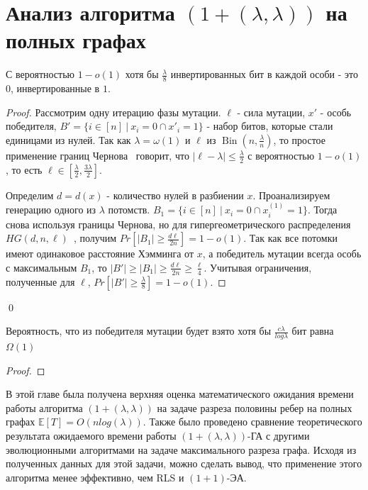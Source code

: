 \documentclass[times]{itmo-student-thesis}
\newcommand{\alglambda}{${(1 + (\lambda , \lambda))}$\xspace}
\newcommand{\alglambdaf}{${(1 + (\lambda , \lambda))}$-ГА\xspace}
\newcommand{\oea}{\mbox{$(1 + 1)$-ЭА}\xspace}
\DeclareMathOperator{\Bin}{Bin}
\begin{document}
\section{Анализ алгоритма \alglambda на полных графах}

\begin{lemma}\label{lem:mut1}
С вероятностью $1- o(1)$ хотя бы $\frac{\lambda}{8}$ инвертированных бит в каждой особи - это $0$, инвертированные в $1$.
\end{lemma}

\begin{proof}
Рассмотрим одну итерацию фазы мутации. $\ell$ - сила мутации, $x'$ - особь победителя, $B' = \{i \in [n] ~|~ x_i = 0 \cap x'_i = 1\}$ - набор битов, которые стали единицами из нулей.
Так как $\lambda = \omega(1)$ и $\ell$ из $\Bin\left(n, \frac{\lambda}{n}\right)$, то простое применение границ Чернова~\cite{ссылка} говорит, что $|\ell - \lambda| \le \frac{\lambda}{2}$ с вероятностью $1- o(1)$, то есть $\ell \in [\frac{\lambda}{2}, \frac{3\lambda}{2}]$.

Определим $d = d(x)$ - количество нулей в разбиении $x$. Проанализируем генерацию одного из $\lambda$ потомств. $B_1 = \{i \in [n] ~|~ x_i = 0 \cap x^{(1)}_i = 1\}$. Тогда снова используя границы Чернова, но для гипергеометрического распределения $HG(d, n, \ell)$~\cite{ссылка}, получим $Pr[|B_1| \ge \frac{d\ell}{2n}] = 1 - o(1)$.
Так как все потомки имеют одинаковое расстояние Хэмминга от $x$, а победитель мутации всегда особь с максимальным $B_1$, то $|B'| \ge |B_1| \ge \frac{d\ell}{2n} \ge \frac{\ell}{4}$. Учитывая ограничения, полученные для $\ell$, $Pr[|B'| \ge \frac{\lambda}{8}] = 1 - o(1)$.
\end{proof}\qed

\begin{lemma}\label{lem:mut2}
Вероятность, что из победителя мутации будет взято хотя бы $\frac{c\lambda}{log\lambda}$ бит равна $\Omega(1)$
\end{lemma}

\begin{proof}

\end{proof}
\chapterconclusion

В этой главе была получена верхняя оценка математического ожидания времени работы алгоритма \alglambda на задаче разреза половины ребер на полных графах $\mathbb{E}[T]=O(nlog(\lambda))$. Также было проведено сравнение теоретического результата ожидаемого времени работы \alglambdaf с другими эволюционными алгоритмами на задаче максимального разреза графа. Исходя из полученных данных для этой задачи, можно сделать вывод, что применение этого алгоритма менее эффективно, чем RLS и \oea.
\end{document}
